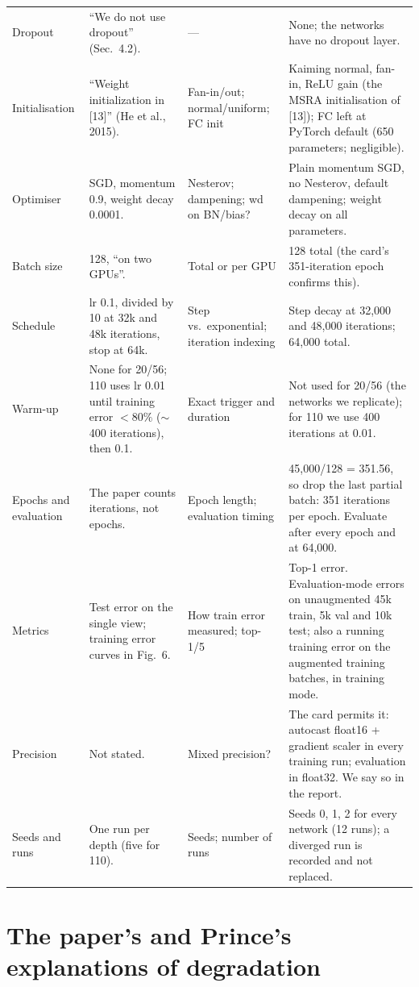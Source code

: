 \documentclass[11pt,a4paper]{article}
\begin{document}
\begin{longtable}{@{}p{2.4cm}p{4.3cm}p{2.6cm}p{6.0cm}@{}}
Dropout & ``We do not use dropout'' (Sec.~4.2). & --- & None; the networks have no dropout layer.\\
Initialisation & ``Weight initialization in [13]'' (He et al., 2015). & Fan-in/out; normal/uniform; FC init & Kaiming normal, fan-in, ReLU gain (the MSRA initialisation of [13]); FC left at PyTorch default (650 parameters; negligible).\\
Optimiser & SGD, momentum 0.9, weight decay 0.0001. & Nesterov; dampening; wd on BN/bias? & Plain momentum SGD, no Nesterov, default dampening; weight decay on all parameters.\\
Batch size & 128, ``on two GPUs''. & Total or per GPU & 128 total (the card's 351-iteration epoch confirms this).\\
Schedule & lr 0.1, divided by 10 at 32k and 48k iterations, stop at 64k. & Step vs.\ exponential; iteration indexing & Step decay at 32{,}000 and 48{,}000 iterations; 64{,}000 total.\\
Warm-up & None for 20/56; 110 uses lr 0.01 until training error $<80\%$ ($\sim$400 iterations), then 0.1. & Exact trigger and duration & Not used for 20/56 (the networks we replicate); for 110 we use 400 iterations at 0.01.\\
Epochs and evaluation & The paper counts iterations, not epochs. & Epoch length; evaluation timing & 45{,}000/128 = 351.56, so drop the last partial batch: 351 iterations per epoch. Evaluate after every epoch and at 64{,}000.\\
Metrics & Test error on the single view; training error curves in Fig.~6. & How train error measured; top-1/5 & Top-1 error. Evaluation-mode errors on unaugmented 45k train, 5k val and 10k test; also a running training error on the augmented training batches, in training mode.\\
Precision & Not stated. & Mixed precision? & The card permits it: autocast float16 + gradient scaler in every training run; evaluation in float32. We say so in the report.\\
Seeds and runs & One run per depth (five for 110). & Seeds; number of runs & Seeds 0, 1, 2 for every network (12 runs); a diverged run is recorded and not replaced.\\
\bottomrule
\end{longtable}

\section{The paper's and Prince's explanations of degradation}
\end{document}
